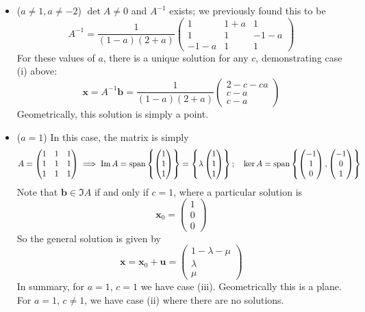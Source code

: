 \documentclass{article}
\begin{document}
	\begin{itemize}
		\item ($a \neq 1, a \neq -2$) $\det A \neq 0$ and $A^{-1}$ exists; we previously found this to be
		\[ A^{-1} = \frac{1}{(1-a)(2+a)}\begin{pmatrix}
			1 & 1+a & 1 \\ 1 & 1 & -1-a \\ -1-a & 1 & 1
		\end{pmatrix} \]
		For these values of $a$, there is a unique solution for any $c$, demonstrating case (i) above:
		\[ \bm x = A^{-1} \bm b = \frac{1}{(1-a)(2+a)}\begin{pmatrix}
			2-c-ca \\ c-a \\ c-a
		\end{pmatrix} \]
		Geometrically, this solution is simply a point.
		\item ($a = 1$) In this case, the matrix is simply
		\[ A = \begin{pmatrix}
			1 & 1 & 1 \\ 1 & 1 & 1 \\ 1 & 1 & 1
		\end{pmatrix} \implies \Im A = \operatorname{span} \left\{ \begin{pmatrix}
			1 \\ 1 \\ 1
		\end{pmatrix} \right\} = \left\{ \lambda\begin{pmatrix}
			1 \\ 1 \\ 1
		\end{pmatrix} \right\};\quad \ker A = \operatorname{span}\left\{ \begin{pmatrix}
			-1 \\ 1 \\ 0
		\end{pmatrix}, \begin{pmatrix}
			-1 \\ 0 \\ 1
		\end{pmatrix} \right\} \]
		Note that $\bm b \in \Im A$ if and only if $c=1$, where a particular solution is
		\[ \bm x_0 = \begin{pmatrix}
			1 \\ 0 \\ 0
		\end{pmatrix} \]
		So the general solution is given by
		\[ \bm x = \bm x_0 + \bm u = \begin{pmatrix}
			1 - \lambda - \mu \\ \lambda \\ \mu
		\end{pmatrix} \]
		In summary, for $a=1$, $c=1$ we have case (iii). Geometrically this is a plane. For $a=1$, $c \neq 1$, we have case (ii) where there are no solutions.


\end{itemize}
\end{document}
